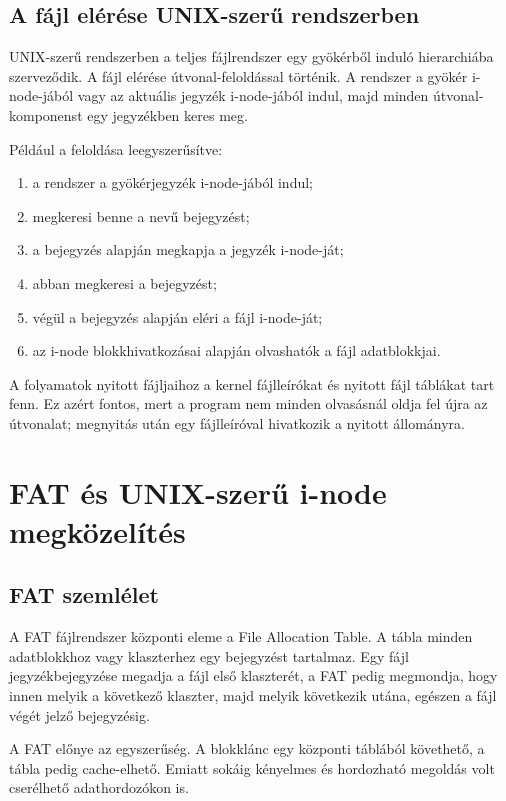 \subsection{A fájl elérése UNIX-szerű rendszerben}

UNIX-szerű rendszerben a teljes fájlrendszer egy gyökérből induló hierarchiába szerveződik. A fájl elérése útvonal-feloldással történik. A rendszer a gyökér i-node-jából vagy az aktuális jegyzék i-node-jából indul, majd minden útvonal-komponenst egy jegyzékben keres meg.

Például a  feloldása leegyszerűsítve:

\begin{enumerate}
  \item a rendszer a gyökérjegyzék i-node-jából indul;
  \item megkeresi benne a  nevű bejegyzést;
  \item a bejegyzés alapján megkapja a  jegyzék i-node-ját;
  \item abban megkeresi a  bejegyzést;
  \item végül a  bejegyzés alapján eléri a fájl i-node-ját;
  \item az i-node blokkhivatkozásai alapján olvashatók a fájl adatblokkjai.
\end{enumerate}

A folyamatok nyitott fájljaihoz a kernel fájlleírókat és nyitott fájl táblákat tart fenn. Ez azért fontos, mert a program nem minden olvasásnál oldja fel újra az útvonalat; megnyitás után egy fájlleíróval hivatkozik a nyitott állományra.

\section{FAT és UNIX-szerű i-node megközelítés}

\subsection{FAT szemlélet}

A FAT fájlrendszer központi eleme a File Allocation Table. A tábla minden adatblokkhoz vagy klaszterhez egy bejegyzést tartalmaz. Egy fájl jegyzékbejegyzése megadja a fájl első klaszterét, a FAT pedig megmondja, hogy innen melyik a következő klaszter, majd melyik következik utána, egészen a fájl végét jelző bejegyzésig.

A FAT előnye az egyszerűség. A blokklánc egy központi táblából követhető, a tábla pedig cache-elhető. Emiatt sokáig kényelmes és hordozható megoldás volt cserélhető adathordozókon is.

